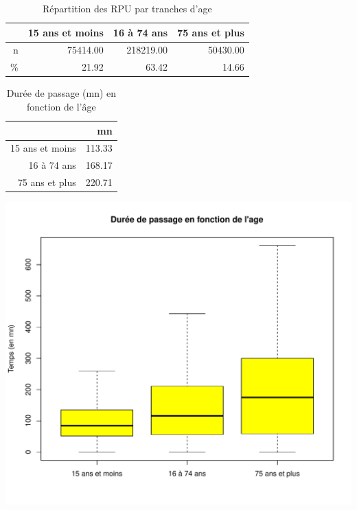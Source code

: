 \documentclass[12pt,english,french,twoside]{book}\usepackage[]{graphicx}\usepackage[]{color}
\makeatletter
\def\maxwidth{ %
  \ifdim\Gin@nat@width>\linewidth
    \linewidth
  \else
    \Gin@nat@width
  \fi
}
\newenvironment{knitrout}{}{} %
\makeatother
\begin{document}
\begin{table}[ht]
\centering
\begin{tabular}{rrrr}
  \hline
 & 15 ans et moins & 16 à 74 ans & 75 ans et plus \\ 
  \hline
n & 75414.00 & 218219.00 & 50430.00 \\ 
  \% & 21.92 & 63.42 & 14.66 \\ 
   \hline
\end{tabular}
\caption[Répartition des RPU par tranches d'age]{Répartition des RPU par tranches d'age } 
\label{tab:tranches_age}
\end{table}




\begin{table}[ht]
\centering
\begin{tabular}{rr}
  \hline
 & mn \\ 
  \hline
15 ans et moins & 113.33 \\ 
  16 à 74 ans & 168.17 \\ 
  75 ans et plus & 220.71 \\ 
   \hline
\end{tabular}
\caption[Durée de passage et age]{Durée de passage (mn) en fonction de l'âge} 
\label{tab:age_dp}
\end{table}



\begin{center}
\begin{knitrout}
\color{fgcolor}
\includegraphics[width=\maxwidth]{figure/age_groupe2} 

\end{knitrout}

 \label{fig:bp_age}
\end{center}
\end{document}
